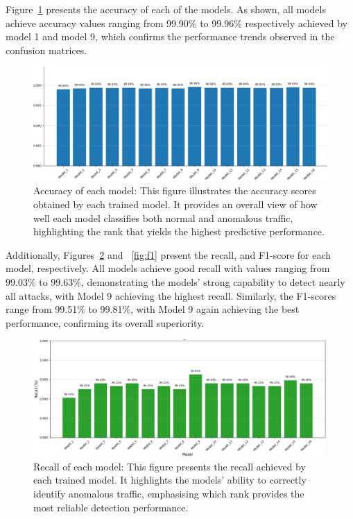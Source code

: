 \documentclass[preprint,12pt,authoryear]{elsarticle}
\begin{document}
 Figure~\ref{fig:accl} presents the accuracy of each of the models. As shown, all models achieve accuracy values ranging from 99.90\% to 99.96\% respectively achieved by model 1 and model 9, which confirms the performance trends observed in the confusion matrices.
\begin{figure}[H]
    \centering
    \includegraphics[width=1.1\linewidth]{accu.png}
    \caption{Accuracy of each model: This figure illustrates the accuracy scores obtained by each trained model. It provides an overall view of how well each model classifies both normal and anomalous traffic, highlighting the rank that yields the highest predictive performance.}
    \label{fig:accl}
\end{figure}
\noindent Additionally, Figures~\ref{fig:recall} and ~\ref{fig:f1} present the recall, and F1-score for each model, respectively. All models achieve good recall with values ranging from 99.03\% to 99.63\%, demonstrating the models’ strong capability to detect nearly all attacks, with Model 9 achieving the highest recall. Similarly, the F1-scores range from 99.51\% to 99.81\%, with Model 9 again achieving the best performance, confirming its overall superiority.

\begin{figure}[H]
    \centering
    \includegraphics[width=1.1\linewidth]{recall.png}
    \caption{Recall of each model: This figure presents the recall achieved by each trained model. It highlights the models’ ability to correctly identify anomalous traffic, emphasising which rank provides the most reliable detection performance.}
    \label{fig:recall}
\end{figure}
\end{document}
